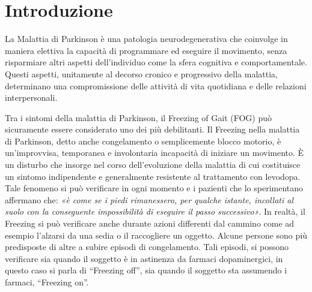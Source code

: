 


\chapter{Introduzione}\label{cap1:Introduzione}

La Malattia di Parkinson è una patologia neurodegenerativa che coinvolge in maniera elettiva la capacità di programmare ed eseguire il movimento, senza risparmiare altri aspetti dell’individuo come la sfera cognitiva e comportamentale. Questi aspetti, unitamente al decorso cronico e progressivo della malattia, determinano una compromissione delle attività di vita quotidiana e delle relazioni interpersonali.

Tra i sintomi della malattia di Parkinson, il Freezing of Gait (FOG) può sicuramente essere considerato uno dei più debilitanti. Il Freezing nella malattia di Parkinson, detto anche congelamento o semplicemente blocco motorio, è un’improvvisa, temporanea e involontaria incapacità di iniziare un movimento. È un disturbo che insorge nel corso dell’evoluzione della malattia di cui costituisce un sintomo indipendente e generalmente resistente al trattamento con levodopa. Tale fenomeno si può verificare in ogni momento e i pazienti che lo sperimentano affermano che: \textit{«è come se i piedi rimanessero, per qualche istante, incollati al suolo con la conseguente impossibilità di eseguire il passo successivo»}. In realtà, il Freezing si può verificare anche durante azioni differenti dal cammino come ad esempio l’alzarsi da una sedia o il raccogliere un oggetto. Alcune persone sono più predisposte di altre a subire episodi di congelamento. Tali episodi, si possono verificare sia quando il soggetto è in astinenza da farmaci dopaminergici, in questo caso si parla di “Freezing off”, sia quando il soggetto sta assumendo i farmaci, “Freezing on”. \\

